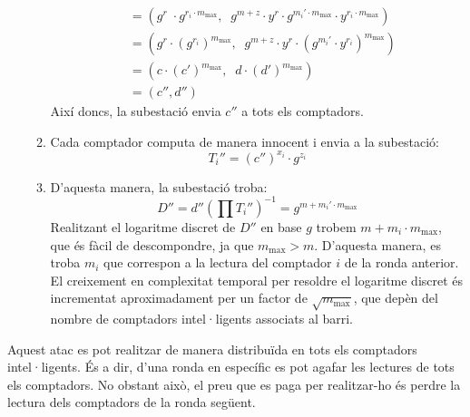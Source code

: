 \begin{enumerate}
\begin{enumerate}
\begin{align*}
		&= ( g^r \; \cdot g^{r_i \cdot m_{\textrm{max}}} , \;\; g^{m + z} \cdot y^r \cdot g^{m_i' \cdot m_{\textrm{max}}} \cdot y^{r_i \cdot m_{\textrm{max}}} )\\
		&= (g^r \cdot (g^{r_i})^{m_{\textrm{max}}}, \;\; g^{m + z} \cdot y^r \cdot (g^{m_i'} \cdot y^{r_i})^{m_{\textrm{max}}} )\\
		&=(c \cdot (c')^{m_{\textrm{max}}}, \;\; d \cdot (d')^{m_{\textrm{max}}})\\
		&=(c'', d'')
		\end{align*}
		Així doncs, la subestació envia $c''$ a tots els comptadors.
		\item Cada comptador computa de manera innocent i envia a la subestació:
		\[T_i'' = (c'')^{x_i} \cdot g^{z_i}\]
		\item D'aquesta manera, la subestació troba:
		\[D'' = d'' (\prod T_i'')^{-1} = g^{m + m_i' \cdot m_{\textrm{max}}}\]
		Realitzant el logaritme discret de $D''$ en base $g$ trobem $m + m_i \cdot m_{\textrm{max}}$, que és fàcil de descompondre, ja que $m_{\textrm{max}} > m$. D'aquesta manera, es troba $m_i$ que correspon a la lectura del comptador $i$ de la ronda anterior.\\
		El creixement en complexitat temporal per resoldre el logaritme discret és incrementat aproximadament per un factor de $\sqrt{m_{\textrm{max}}} $, que depèn del nombre de comptadors intel·ligents associats al barri.
	\end{enumerate}
\end{enumerate}
Aquest atac es pot realitzar de manera distribuïda en tots els comptadors intel·ligents. És a dir, d'una ronda en específic es pot agafar les lectures de tots els comptadors. No obstant això, el preu que es paga per realitzar-ho és perdre la lectura dels comptadors de la ronda següent.
\newpage
{}
